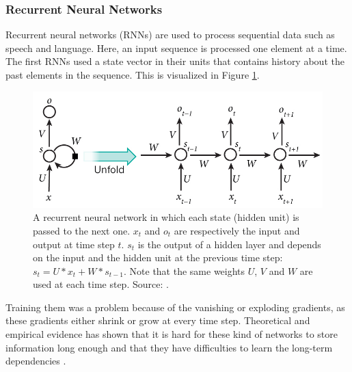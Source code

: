 \documentclass[a4paper]{article}
\begin{document}
\subsubsection{Recurrent Neural Networks}
Recurrent neural networks (RNNs) are used to process sequential data such as speech and language. Here, an input sequence is processed one element at a time. The first RNNs used a state vector in their units that contains history about the past elements in the sequence. This is visualized in Figure \ref{fig:rnnunrolled}.
\begin{figure}[H]
\includegraphics[width=\linewidth]{images/RNN-unrolled.jpg} %
\caption{A recurrent neural network in which each state (hidden unit) is passed to the next one. $x_t$ and $o_t$ are respectively the input and output at time step $t$. $s_t$ is the output of a hidden layer and depends on the input and the hidden unit at the previous time step: $s_t = U*x_t + W*s_{t-1}$. Note that the same weights $U$, $V$ and $W$ are used at each time step. Source: \cite{LeCun2015DeepLearning}.}
\label{fig:rnnunrolled}
\end{figure}

Training them was a problem because of the vanishing or exploding gradients, as these gradients either shrink or grow at every time step. Theoretical and empirical evidence has shown that it is hard for these kind of networks to store information long enough and that they have difficulties to learn the long-term dependencies \citep{bengio1994learning}.\\ %
\end{document}
